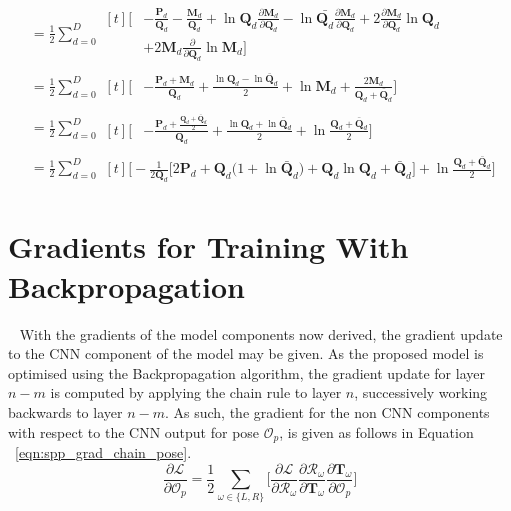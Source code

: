 \begin{align}
  {}&= \frac{1}{2} \sum_{d = 0}^{D}
  \begin{aligned}[t]
    \Bigg[ {}&
      -\frac{\bm{P}_{d}}{\bm{Q}_{d}}
      -\frac{\bm{M}_{d}}{\bm{Q}_{d}}
      +\ln{\bm{Q}_{d}} \frac{\partial \bm{M}_{d}}{\partial \bm{Q}_{d}}
      -\ln{\bar{\bm{Q}_{d}}} \frac{\partial \bm{M}_{d}}{\partial \bm{Q}_{d}}
      +2 \frac{\partial \bm{M}_{d}}{\partial \bm{Q}_{d}} \ln{\bm{Q}_{d}}\\
      {}&
      +2 \bm{M}_{d} \frac{\partial}{\partial \bm{Q}_{d}} \ln{\bm{M}_{d}}
    \Bigg]
  \end{aligned}\\
  {}&= \frac{1}{2} \sum_{d = 0}^{D}
  \begin{aligned}[t]
    \Bigg[ {}&
      -\frac{\bm{P}_{d} + \bm{M}_{d}}{\bm{Q}_{d}}
      +\frac{\ln{\bm{Q}_{d} - \ln{\bar{\bm{Q}}_{d}}}}{2}
      +\ln{\bm{M}_{d}} 
      +\frac{2\bm{M}_{d}}{\bm{Q}_{d} + \bar{\bm{Q}}_{d}}
    \Bigg]
  \end{aligned}\\
  {}&= \frac{1}{2} \sum_{d = 0}^{D}
  \begin{aligned}[t]
    \Bigg[ {}&
      -\frac{\bm{P}_{d} + \frac{\bm{Q}_{d} + \bar{\bm{Q}}_{d}}{2}}{\bm{Q}_{d}}
      +\frac{\ln{\bm{Q}_{d}} + \ln{\bar{\bm{Q}}_{d}}}{2}
      +\ln{\frac{\bm{Q}_{d} + \bar{\bm{Q}}_{d}}{2}}
    \Bigg]
  \end{aligned}\\
  {}&= \frac{1}{2} \sum_{d = 0}^{D}
  \begin{aligned}[t]
    \Bigg [
      -\frac{1}{2 \bm{Q}_{d}} \Bigg[
        2 \bm{P}_{d} + \bm{Q}_{d} \big( 1 + \ln{\bar{\bm{Q}}_{d}} \big)
        + \bm{Q}_{d} \ln{\bm{Q}_{d}}
        + \bar{\bm{Q}}_{d}
      \Bigg]
      +\ln{\frac{\bm{Q}_{d} + \bar{\bm{Q}}_{d}}{2}}
    \Bigg]
  \end{aligned}
\end{align}

\section{Gradients for Training With Backpropagation}
~\label{sec:spp_backprop}
With the gradients of the model components now derived, the gradient update to the CNN component 
of the model may be given. As the proposed model is optimised using the Backpropagation algorithm, 
the gradient update for layer \( n - m \) is computed by applying the chain rule to layer \( n \), 
successively working backwards to layer \( n - m \). As such, the gradient for the non CNN components 
with respect to the CNN output for pose \( \mathcal{O}_{p} \), is given as follows in Equation
~\ref{eqn:spp_grad_chain_pose}.
\begin{equation}
  \label{eqn:spp_grad_chain_pose}
  \frac{\partial \mathcal{L}}{\partial \mathcal{O}_{p}} = 
  \frac{1}{2} \sum_{\omega \in \{L, R\}} \Bigg[
    \frac{\partial \mathcal{L}}{\partial \mathcal{R}_{\omega}}
    \frac{\partial \mathcal{R}_{\omega}}{\partial \bm{T}_{\omega}}
    \frac{\partial \bm{T}_{\omega}}{\partial \mathcal{O}_{p}}
  \Bigg]
\end{equation}

